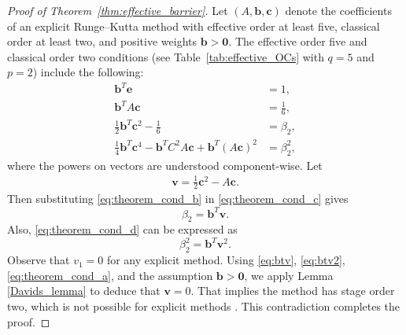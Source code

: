 \begin{proof}[Proof of Theorem~\ref{thm:effective_barrier}]
    Let $(A,\bm{b},\bm{c})$ denote the coefficients of an explicit Runge--Kutta method with
    effective order at least five, classical order at least two, and positive 
    weights $\bm{b} > \bm{0}$.
    The effective order five and classical order two conditions
    (see Table~\ref{tab:effective_OCs} with $q=5$ and $p=2$) include the following:
    \begin{subequations}\label{eq:theorem_cond}
    		\begin{align}
    			\bm{b}^T\bm{e} & = 1, \label{eq:theorem_cond_a} \\
             	\bm{b}^TA\bm{c} &= \frac{1}{6}, \label{eq:theorem_cond_b} \\
            	\frac{1}{2}\bm{b}^T\bm{c}^2 - \frac{1}{6} &= \beta_2, \label{eq:theorem_cond_c} \\
            	\frac{1}{4}\bm{b}^T\bm{c}^4 - \bm{b}^TC^2A\bm{c} + \bm{b}^T(A\bm{c})^2 &= \beta_2^2, \label{eq:theorem_cond_d}
        	\end{align}
	\end{subequations}
	where the powers on vectors are understood component-wise. 
	Let
	\begin{align*} 
		\bm{v} = \frac{1}{2}\bm{c}^2 - A\bm{c}.
	\end{align*}
	Then substituting \eqref{eq:theorem_cond_b} in \eqref{eq:theorem_cond_c} gives
	\begin{equation}\label{eq:btv}
		\beta_2 = \bm{b}^T\bm{v}.
	\end{equation}
	Also, \eqref{eq:theorem_cond_d} can be expressed as
	\begin{equation}\label{eq:btv2}
		\beta_2^2 = \bm{b}^T\bm{v}^2.
	\end{equation}
        Observe that $v_1=0$ for any explicit method.  Using  \eqref{eq:btv},
        \eqref{eq:btv2}, \eqref{eq:theorem_cond_a}, and the assumption $\bm{b}>\bm{0}$, we
        apply Lemma \ref{Davids_lemma} to deduce that $\bm{v}=0$.
        That implies the method has stage order two, which is not possible for
        explicit methods \cite{Ruuth2002}.  This contradiction completes the proof.
    
\end{proof}
